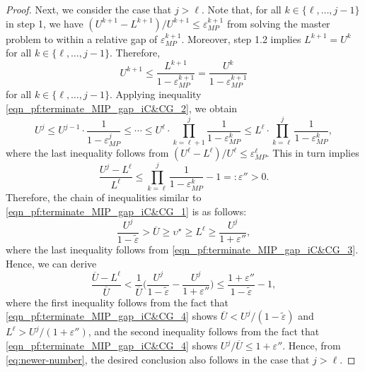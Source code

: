 \documentclass[preprint,review,11pt]{elsarticle}
\theoremstyle{definition}
\theoremstyle{remark}
\newcommand{\epst}{\widetilde{\varepsilon}}
\newcommand{\calO}{\mathcal{O}}
\newcommand{\Ubar}{\overline{U}}
\begin{document}
\begin{proof}
Next, we consider the case that $j>\ell$. Note that, for all $k\in\{\ell,\dots,j-1\}$ in step 1, we have $(U^{k+1}-L^{k+1})/U^{k+1} \leq \varepsilon_{MP}^{k+1}$ from solving the master problem to within a relative gap of $\varepsilon_{MP}^{k+1}$. Moreover, step 1.2 implies $L^{k+1}=U^k$ for all $k\in\{\ell,\dots,j-1\}$. Therefore, 
%
\begin{equation}  \label{eqn_pf:terminate_MIP_gap_iC&CG_2}
  U^{k+1} \leq \frac{L^{k+1}}{1-\varepsilon_{MP}^{k+1}} = \frac{U^k}{1-\varepsilon_{MP}^{k+1}} 
\end{equation}
%
for all $k\in\{\ell,\dots,j-1\}$. Applying inequality \eqref{eqn_pf:terminate_MIP_gap_iC&CG_2}, we obtain 
%
$$U^j \leq U^{j-1}\cdot\frac{1}{1-\varepsilon_{MP}^j}\leq \cdots \leq U^\ell\cdot\prod_{k=\ell+1}^j \frac{1}{1-\varepsilon_{MP}^k} \leq L^\ell\cdot \prod_{k=\ell}^j\frac{1}{1-\varepsilon_{MP}^k}, $$
%
where the last inequality follows from $(U^\ell-L^\ell)/U^\ell\leq\varepsilon_{MP}^\ell$.  This in turn implies
%
\begin{equation}  \label{eqn_pf:terminate_MIP_gap_iC&CG_3}
\frac{U^j-L^\ell}{L^\ell}\leq \prod_{k=\ell}^j\frac{1}{1-\varepsilon_{MP}^k}-1 =: \varepsilon'' > 0.%
\end{equation}
%
Therefore, the chain of inequalities similar to \eqref{eqn_pf:terminate_MIP_gap_iC&CG_1} is as follows:
%
\begin{equation} \label{eqn_pf:terminate_MIP_gap_iC&CG_4}
  \frac{U^j}{1-\epst} > \Ubar \geq \upsilon^\star \geq L^\ell \geq  \frac{U^j}{1+\varepsilon''},
\end{equation}
%
where the last inequality follows from \eqref{eqn_pf:terminate_MIP_gap_iC&CG_3}. Hence, we can derive
%
\begin{equation}\label{eq:newer-number}
\frac{\Ubar-L^\ell}{\Ubar}< \frac{1}{\Ubar} \Bigg( \frac{U^j}{1-\epst}-\frac{U^j}{1+\varepsilon''} \Bigg) \leq \frac{1+\varepsilon''}{1-\epst}-1,%
\end{equation}
%
where the first inequality follows from the fact that \eqref{eqn_pf:terminate_MIP_gap_iC&CG_4} shows $\Ubar<U^j/(1-\epst)$ and $L^\ell>U^j/(1+\varepsilon'')$, and the second inequality follows from the fact that \eqref{eqn_pf:terminate_MIP_gap_iC&CG_4} shows $U^j/\Ubar\leq 1+\varepsilon''$.  Hence, from \eqref{eq:newer-number}, the desired conclusion also follows in the case that $j > \ell$. %
\end{proof}
\end{document}
